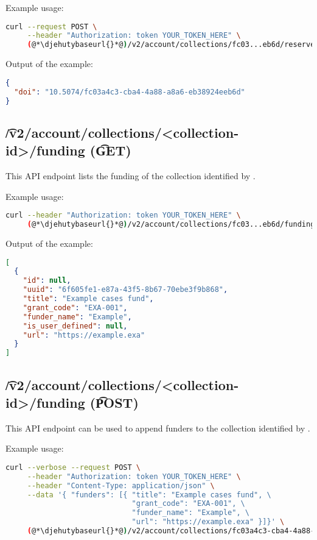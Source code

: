   Example usage:
\begin{lstlisting}[language=bash]
curl --request POST \
     --header "Authorization: token YOUR_TOKEN_HERE" \
     (@*\djehutybaseurl{}*@)/v2/account/collections/fc03...eb6d/reserve_doi | jq
\end{lstlisting}

  Output of the example:
\begin{lstlisting}[language=JSON]
{
  "doi": "10.5074/fc03a4c3-cba4-4a88-a8a6-eb38924eeb6d"
}
\end{lstlisting}

\subsection{\t{/v2/account/collections/<collection-id>/funding} (\t{GET})}

  This API endpoint lists the funding of the collection identified by .

  Example usage:
\begin{lstlisting}[language=bash]
curl --header "Authorization: token YOUR_TOKEN_HERE" \
     (@*\djehutybaseurl{}*@)/v2/account/collections/fc03...eb6d/funding | jq
\end{lstlisting}

  Output of the example:
\begin{lstlisting}[language=JSON]
[
  {
    "id": null,
    "uuid": "6f605fe1-e87a-43f5-8b67-70ebe3f9b868",
    "title": "Example cases fund",
    "grant_code": "EXA-001",
    "funder_name": "Example",
    "is_user_defined": null,
    "url": "https://example.exa"
  }
]
\end{lstlisting}

\subsection{\t{/v2/account/collections/<collection-id>/funding} (\t{POST})}
\label{sec:api-v2-collections-funding-post}

  This API endpoint can be used to append funders to the collection identified
  by \code{collection-id}.

  \fundingParameters

  Example usage:
\begin{lstlisting}[language=bash]
curl --verbose --request POST \
     --header "Authorization: token YOUR_TOKEN_HERE" \
     --header "Content-Type: application/json" \
     --data '{ "funders": [{ "title": "Example cases fund", \
                             "grant_code": "EXA-001", \
                             "funder_name": "Example", \
                             "url": "https://example.exa" }]}' \
     (@*\djehutybaseurl{}*@)/v2/account/collections/fc03a4c3-cba4-4a88-a8a6-eb38924eeb6d/funding
\end{lstlisting}

